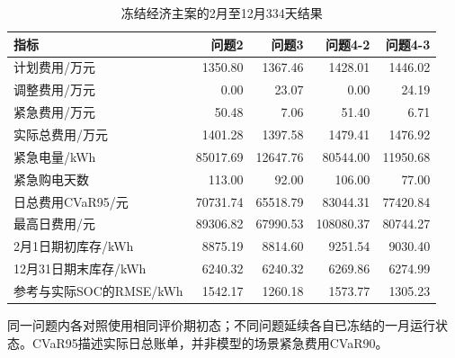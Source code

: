 \begin{table}[htbp]\centering\small
\caption{冻结经济主案的2月至12月334天结果}
\label{tab:annual_summary}
\begin{tabularx}{\linewidth}{LRRRR}\toprule
指标 & 问题2 & 问题3 & 问题4-2 & 问题4-3\\\midrule
计划费用/万元 & 1350.80 & 1367.46 & 1428.01 & 1446.02\\
调整费用/万元 & 0.00 & 23.07 & 0.00 & 24.19\\
紧急费用/万元 & 50.48 & 7.06 & 51.40 & 6.71\\
实际总费用/万元 & 1401.28 & 1397.58 & 1479.41 & 1476.92\\
紧急电量/kWh & 85017.69 & 12647.76 & 80544.00 & 11950.68\\
紧急购电天数 & 113.00 & 92.00 & 106.00 & 77.00\\
日总费用CVaR95/元 & 70731.74 & 65518.79 & 83044.31 & 77420.84\\
最高日费用/元 & 89306.82 & 67990.53 & 108080.37 & 80744.27\\
2月1日期初库存/kWh & 8875.19 & 8814.60 & 9251.54 & 9030.40\\
12月31日期末库存/kWh & 6240.32 & 6240.32 & 6269.86 & 6274.99\\
参考与实际SOC的RMSE/kWh & 1542.17 & 1260.18 & 1573.77 & 1305.23\\
\bottomrule\end{tabularx}
\par\smallskip\parbox{\linewidth}{\footnotesize 同一问题内各对照使用相同评价期初态；不同问题延续各自已冻结的一月运行状态。CVaR95描述实际日总账单，并非模型的场景紧急费用CVaR90。}
\end{table}
